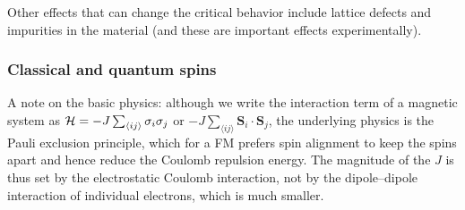 \begin{diagram}
\end{diagram}

Other effects that can change the critical behavior include lattice defects and
impurities in the material (and these are important effects experimentally).

\subsubsection*{Classical and quantum spins}

A note on the basic physics: although we write the interaction term of a magnetic system
as $\mathcal{H} = -J\sum_{\langle ij\rangle}\sigma_i\sigma_j$ or
$-J\sum_{\langle ij\rangle}\mathbf{S}_i\cdot\mathbf{S}_j$, the underlying physics is the
Pauli exclusion principle, which for a FM prefers spin alignment to keep the spins apart
and hence reduce the Coulomb repulsion energy. The magnitude of the $J$ is thus set by
the electrostatic Coulomb interaction, not by the dipole--dipole interaction of
individual electrons, which is much smaller.

